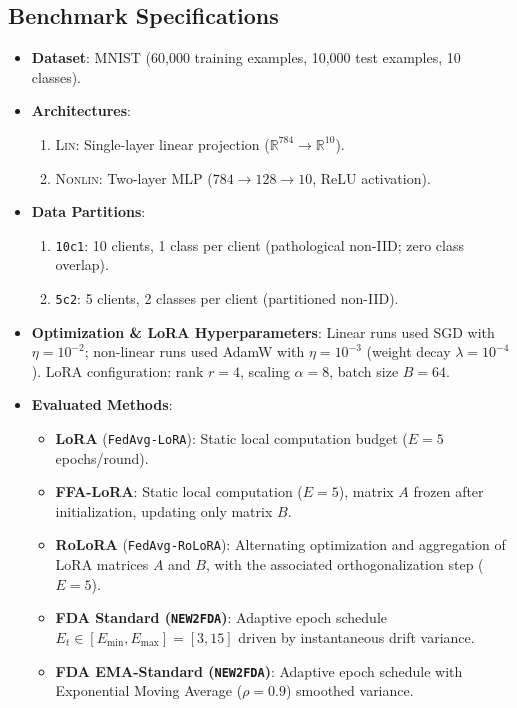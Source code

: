 \documentclass[10pt,a4paper]{article}
\begin{document}
\subsection{Benchmark Specifications}
\begin{itemize}
    \item \textbf{Dataset}: MNIST (60,000 training examples, 10,000 test examples, 10 classes).
    \item \textbf{Architectures}:
    \begin{enumerate}
        \item \textsc{Lin}: Single-layer linear projection ($\mathbb{R}^{784} \to \mathbb{R}^{10}$).
        \item \textsc{Nonlin}: Two-layer MLP ($784 \to 128 \to 10$, ReLU activation).
    \end{enumerate}
    \item \textbf{Data Partitions}:
    \begin{enumerate}
        \item \texttt{10c1}: 10 clients, 1 class per client (pathological non-IID; zero class overlap).
        \item \texttt{5c2}: 5 clients, 2 classes per client (partitioned non-IID).
    \end{enumerate}
    \item \textbf{Optimization \& LoRA Hyperparameters}: Linear runs used SGD with $\eta=10^{-2}$; non-linear runs used AdamW with $\eta=10^{-3}$ (weight decay $\lambda=10^{-4}$). LoRA configuration: rank $r=4$, scaling $\alpha=8$, batch size $B=64$.
    \item \textbf{Evaluated Methods}:
    \begin{itemize}
        \item \textbf{LoRA} (\texttt{FedAvg-LoRA}): Static local computation budget ($E=5$ epochs/round).
        \item \textbf{FFA-LoRA}: Static local computation ($E=5$), matrix $A$ frozen after initialization, updating only matrix $B$.
        \item \textbf{RoLoRA} (\texttt{FedAvg-RoLoRA}): Alternating optimization and aggregation of LoRA matrices $A$ and $B$, with the associated orthogonalization step ($E=5$).
        \item \textbf{FDA Standard (\texttt{NEW2FDA})}: Adaptive epoch schedule $E_t \in [E_{\min}, E_{\max}] = [3, 15]$ driven by instantaneous drift variance.
        \item \textbf{FDA EMA-Standard (\texttt{NEW2FDA})}: Adaptive epoch schedule with Exponential Moving Average ($\rho=0.9$) smoothed variance.

\end{itemize}
\end{itemize}
\end{document}
